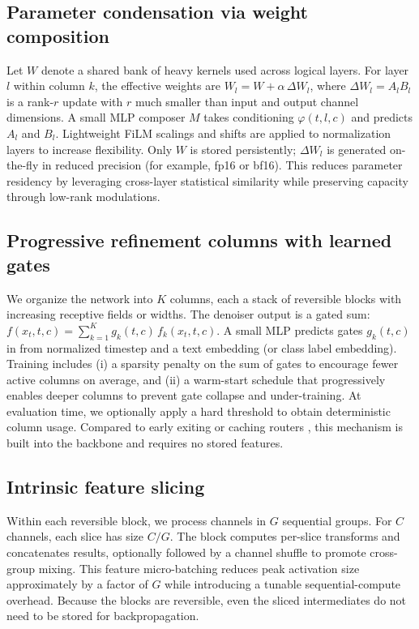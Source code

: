 \documentclass{article}
\begin{document}
\subsection{Parameter condensation via weight composition}
Let $W$ denote a shared bank of heavy kernels used across logical layers. For layer $l$ within column $k$, the effective weights are $W_l = W + \alpha \, \Delta W_l$, where $\Delta W_l = A_l B_l$ is a rank-$r$ update with $r$ much smaller than input and output channel dimensions. A small MLP composer $M$ takes conditioning $\varphi(t, l, c)$ and predicts $A_l$ and $B_l$. Lightweight FiLM scalings and shifts are applied to normalization layers to increase flexibility. Only $W$ is stored persistently; $\Delta W_l$ is generated on-the-fly in reduced precision (for example, fp16 or bf16). This reduces parameter residency by leveraging cross-layer statistical similarity while preserving capacity through low-rank modulations.

\subsection{Progressive refinement columns with learned gates}
We organize the network into $K$ columns, each a stack of reversible blocks with increasing receptive fields or widths. The denoiser output is a gated sum:
\(f(x_t, t, c) = \sum_{k=1}^{K} g_k(t, c) \, f_k(x_t, t, c).\)
A small MLP predicts gates $g_k(t, c)$ in  from normalized timestep and a text embedding (or class label embedding). Training includes (i) a sparsity penalty on the sum of gates to encourage fewer active columns on average, and (ii) a warm-start schedule that progressively enables deeper columns to prevent gate collapse and under-training. At evaluation time, we optionally apply a hard threshold to obtain deterministic column usage. Compared to early exiting \cite{moon-2024-simple} or caching routers \cite{ma-2024-learning}, this mechanism is built into the backbone and requires no stored features.

\subsection{Intrinsic feature slicing}
Within each reversible block, we process channels in $G$ sequential groups. For $C$ channels, each slice has size $C/G$. The block computes per-slice transforms and concatenates results, optionally followed by a channel shuffle to promote cross-group mixing. This feature micro-batching reduces peak activation size approximately by a factor of $G$ while introducing a tunable sequential-compute overhead. Because the blocks are reversible, even the sliced intermediates do not need to be stored for backpropagation.
\end{document}
